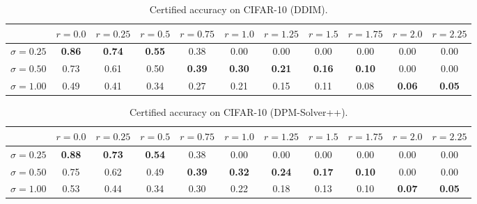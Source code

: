   
\vspace{0.5cm} %
\begin{table*}[h]
	\centering       
	\begin{tabular}{c|cccccccccc}
& $r = 0.0$& $r = 0.25$& $r = 0.5$& $r = 0.75$& $r = 1.0$& $r = 1.25$& $r = 1.5$& $r = 1.75$& $r = 2.0$& $r = 2.25$\\
\midrule
$\sigma = 0.25$ & \textbf{0.86} & \textbf{0.74} & \textbf{0.55} & 0.38 & 0.00 & 0.00 & 0.00 & 0.00 & 0.00 & 0.00\\
$\sigma = 0.50$ & 0.73 & 0.61 & 0.50 & \textbf{0.39} & \textbf{0.30} & \textbf{0.21} & \textbf{0.16} & \textbf{0.10} & 0.00 & 0.00\\
$\sigma = 1.00$ & 0.49 & 0.41 & 0.34 & 0.27 & 0.21 & 0.15 & 0.11 & 0.08 & \textbf{0.06} & \textbf{0.05}\\
	\end{tabular}
	\captionsetup{labelsep=colon} %
	\caption{Certified accuracy on CIFAR-10 (DDIM). }
\end{table*}


\vspace{0.5cm} %
\begin{table*}[h]
	\centering
	\begin{tabular}{c|cccccccccc}
& $r = 0.0$& $r = 0.25$& $r = 0.5$& $r = 0.75$& $r = 1.0$& $r = 1.25$& $r = 1.5$& $r = 1.75$& $r = 2.0$& $r = 2.25$\\
\midrule
$\sigma = 0.25$ & \textbf{0.88} & \textbf{0.73} & \textbf{0.54} & 0.38 & 0.00 & 0.00 & 0.00 & 0.00 & 0.00 & 0.00\\
$\sigma = 0.50$ & 0.75 & 0.62 & 0.49 & \textbf{0.39} & \textbf{0.32} & \textbf{0.24} & \textbf{0.17} & \textbf{0.10} & 0.00 & 0.00\\
$\sigma = 1.00$ & 0.53 & 0.44 & 0.34 & 0.30 & 0.22 & 0.18 & 0.13 & 0.10 & \textbf{0.07} & \textbf{0.05}\\
	\end{tabular}
	\captionsetup{labelsep=colon} %
	\caption{Certified accuracy on CIFAR-10 (DPM-Solver++).}
	\vspace{0.5cm} %
\end{table*}

